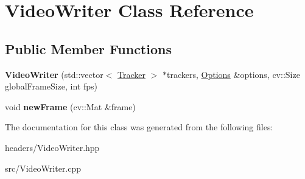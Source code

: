 \hypertarget{classVideoWriter}{\section{Video\-Writer Class Reference}
\label{classVideoWriter}
}
\subsection*{Public Member Functions}
\begin{DoxyCompactItemize}
\item 
\hypertarget{classVideoWriter_a1fa9229cdd19b8335935792388405be4}{{\bfseries Video\-Writer} (std\-::vector$<$ \hyperlink{classTracker}{Tracker} $>$ $\ast$trackers, \hyperlink{structOptions}{Options} \&options, cv\-::\-Size global\-Frame\-Size, int fps)}\label{classVideoWriter_a1fa9229cdd19b8335935792388405be4}

\item 
\hypertarget{classVideoWriter_a831b1acdd93024d4a5ef70c3bec2af14}{void {\bfseries new\-Frame} (cv\-::\-Mat \&frame)}\label{classVideoWriter_a831b1acdd93024d4a5ef70c3bec2af14}

\end{DoxyCompactItemize}


The documentation for this class was generated from the following files\-:\begin{DoxyCompactItemize}
\item 
headers/Video\-Writer.\-hpp\item 
src/Video\-Writer.\-cpp\end{DoxyCompactItemize}

